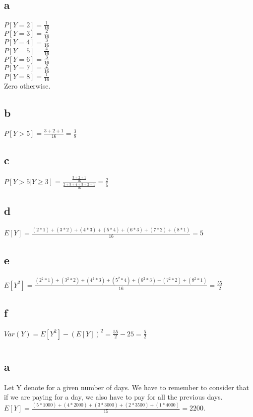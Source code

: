 \documentclass[12pt]{article}
\begin{document}
\section{}
\subsection*{a}
\(P[Y = 2] = \frac{1}{16}\)\\
\(P[Y = 3] = \frac{2}{16}\)\\
\(P[Y = 4] = \frac{3}{16}\)\\
\(P[Y = 5] = \frac{4}{16}\)\\
\(P[Y = 6] = \frac{3}{16}\)\\
\(P[Y = 7] = \frac{2}{16}\)\\
\(P[Y = 8] = \frac{1}{16}\)\\
Zero otherwise.\\
\subsection*{b}
\(P[Y > 5] = \frac{3 + 2 + 1}{16} = \frac{3}{8}\)
\subsection*{c}
\(P[Y > 5| Y \geq 3] = \frac{\frac{3 + 2 + 1}{16}}{\frac{2+3+4+3+2+1}{16}} = \frac{2}{5}\)
\subsection*{d}
\(E[Y] = \frac{(2 * 1) + (3 * 2) + (4 * 3) + (5 * 4) + (6 * 3) + (7 * 2) + (8 *1)}{16} = 5\)
\subsection*{e}
\(E[Y^2] = \frac{(2^2 * 1) + (3^2 * 2) + (4^2 * 3) + (5^2 * 4) + (6^2 * 3) + (7^2 * 2) + (8^2 * 1)}{16} = \frac{55}{2}\)
\subsection*{f}
\(Var(Y) = E[Y^2] - (E[Y])^2 = \frac{55}{2} - 25 = \frac{5}{2}\)

\section{}
\subsection*{a}
Let Y denote for a given number of days. We have to remember to consider that if we are paying for a day, we also have to pay for all the previous days.
\(E[Y] = \frac{(5 * 1000) + (4 * 2000) + (3 * 3000) + (2 * 3500) + (1 * 4000)}{15} = 2200\).
\end{document}
